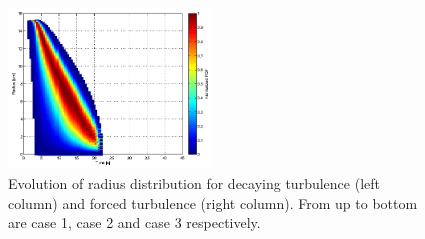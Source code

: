 \documentclass[12pt]{article}
\begin{document}
\begin{figure}[H]
\includegraphics[width=0.48\textwidth]{Figures/pdf_radius_f3}
\caption{Evolution of radius distribution for decaying turbulence (left column) 
and forced turbulence (right column). From up to bottom are case 1, case 2 and case 3 respectively.}\label{fig:rad_distri}
\end{figure}
\end{document}
